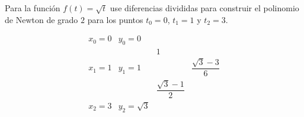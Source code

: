 Para la función
\begin{math}
    f\left(t\right)=
    \sqrt{t}
\end{math}
use diferencias divididas para construir el polinomio
de Newton de grado $2$ para los puntos $t_{0}=0$,
$t_{1}=1$ y $t_{2}=3$.

\[
    \begin{array}{cccccc}
        x_0=0 & y_0=0                                                        \\
              &              & 1                                             \\
        x_1=1 & y_1=1        &                       & \dfrac{\sqrt{3}-3}{6} \\
              &              & \dfrac{\sqrt{3}-1}{2}                         \\
        x_2=3 & y_2=\sqrt{3}
    \end{array}
\]
